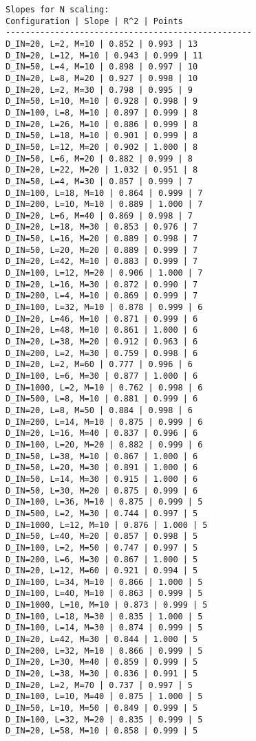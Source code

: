 \documentclass{article}
\begin{document}
\begin{verbatim}
Slopes for N scaling:
Configuration | Slope | R^2 | Points
--------------------------------------------------
D_IN=20, L=2, M=10 | 0.852 | 0.993 | 13
D_IN=20, L=12, M=10 | 0.943 | 0.999 | 11
D_IN=50, L=4, M=10 | 0.898 | 0.997 | 10
D_IN=20, L=8, M=20 | 0.927 | 0.998 | 10
D_IN=20, L=2, M=30 | 0.798 | 0.995 | 9
D_IN=50, L=10, M=10 | 0.928 | 0.998 | 9
D_IN=100, L=8, M=10 | 0.897 | 0.999 | 8
D_IN=20, L=26, M=10 | 0.886 | 0.999 | 8
D_IN=50, L=18, M=10 | 0.901 | 0.999 | 8
D_IN=50, L=12, M=20 | 0.902 | 1.000 | 8
D_IN=50, L=6, M=20 | 0.882 | 0.999 | 8
D_IN=20, L=22, M=20 | 1.032 | 0.951 | 8
D_IN=50, L=4, M=30 | 0.857 | 0.999 | 7
D_IN=100, L=18, M=10 | 0.864 | 0.999 | 7
D_IN=200, L=10, M=10 | 0.889 | 1.000 | 7
D_IN=20, L=6, M=40 | 0.869 | 0.998 | 7
D_IN=20, L=18, M=30 | 0.853 | 0.976 | 7
D_IN=50, L=16, M=20 | 0.889 | 0.998 | 7
D_IN=50, L=20, M=20 | 0.889 | 0.999 | 7
D_IN=20, L=42, M=10 | 0.883 | 0.999 | 7
D_IN=100, L=12, M=20 | 0.906 | 1.000 | 7
D_IN=20, L=16, M=30 | 0.872 | 0.990 | 7
D_IN=200, L=4, M=10 | 0.869 | 0.999 | 7
D_IN=100, L=32, M=10 | 0.878 | 0.999 | 6
D_IN=20, L=46, M=10 | 0.871 | 0.999 | 6
D_IN=20, L=48, M=10 | 0.861 | 1.000 | 6
D_IN=20, L=38, M=20 | 0.912 | 0.963 | 6
D_IN=200, L=2, M=30 | 0.759 | 0.998 | 6
D_IN=20, L=2, M=60 | 0.777 | 0.996 | 6
D_IN=100, L=6, M=30 | 0.877 | 1.000 | 6
D_IN=1000, L=2, M=10 | 0.762 | 0.998 | 6
D_IN=500, L=8, M=10 | 0.881 | 0.999 | 6
D_IN=20, L=8, M=50 | 0.884 | 0.998 | 6
D_IN=200, L=14, M=10 | 0.875 | 0.999 | 6
D_IN=20, L=16, M=40 | 0.837 | 0.996 | 6
D_IN=100, L=20, M=20 | 0.882 | 0.999 | 6
D_IN=50, L=38, M=10 | 0.867 | 1.000 | 6
D_IN=50, L=20, M=30 | 0.891 | 1.000 | 6
D_IN=50, L=14, M=30 | 0.915 | 1.000 | 6
D_IN=50, L=30, M=20 | 0.875 | 0.999 | 6
D_IN=100, L=36, M=10 | 0.875 | 0.999 | 5
D_IN=500, L=2, M=30 | 0.744 | 0.997 | 5
D_IN=1000, L=12, M=10 | 0.876 | 1.000 | 5
D_IN=50, L=40, M=20 | 0.857 | 0.998 | 5
D_IN=100, L=2, M=50 | 0.747 | 0.997 | 5
D_IN=200, L=6, M=30 | 0.867 | 1.000 | 5
D_IN=20, L=12, M=60 | 0.921 | 0.994 | 5
D_IN=100, L=34, M=10 | 0.866 | 1.000 | 5
D_IN=100, L=40, M=10 | 0.863 | 0.999 | 5
D_IN=1000, L=10, M=10 | 0.873 | 0.999 | 5
D_IN=100, L=18, M=30 | 0.835 | 1.000 | 5
D_IN=100, L=14, M=30 | 0.874 | 0.999 | 5
D_IN=20, L=42, M=30 | 0.844 | 1.000 | 5
D_IN=200, L=32, M=10 | 0.866 | 0.999 | 5
D_IN=20, L=30, M=40 | 0.859 | 0.999 | 5
D_IN=20, L=38, M=30 | 0.836 | 0.991 | 5
D_IN=20, L=2, M=70 | 0.737 | 0.997 | 5
D_IN=100, L=10, M=40 | 0.875 | 1.000 | 5
D_IN=50, L=10, M=50 | 0.849 | 0.999 | 5
D_IN=100, L=32, M=20 | 0.835 | 0.999 | 5
D_IN=20, L=58, M=10 | 0.858 | 0.999 | 5

\end{verbatim}
\end{document}
